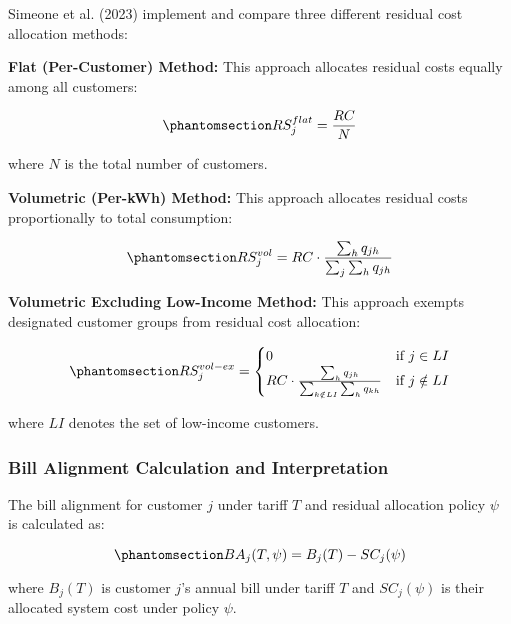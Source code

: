 \documentclass[
  11pt,
]{article}
\begin{document}
Simeone et al. (2023) implement and compare three different residual
cost allocation methods:

\textbf{Flat (Per-Customer) Method:} This approach allocates residual
costs equally among all customers:

\begin{equation}\phantomsection\label{eq-flat-residual}{RS_j^{flat} = \frac{RC}{N}}\end{equation}

where \(N\) is the total number of customers.

\textbf{Volumetric (Per-kWh) Method:} This approach allocates residual
costs proportionally to total consumption:

\begin{equation}\phantomsection\label{eq-vol-residual}{RS_j^{vol} = RC \cdot \frac{\sum_h q_{jh}}{\sum_j \sum_h q_{jh}}}\end{equation}

\textbf{Volumetric Excluding Low-Income Method:} This approach exempts
designated customer groups from residual cost allocation:

\begin{equation}\phantomsection\label{eq-vol-ex-residual}{RS_j^{vol-ex} = \begin{cases}
0 & \text{if } j \in LI \\
RC \cdot \frac{\sum_h q_{jh}}{\sum_{k \notin LI} \sum_h q_{kh}} & \text{if } j \notin LI
\end{cases}}\end{equation}

where \(LI\) denotes the set of low-income customers.

\subsubsection{Bill Alignment Calculation and
Interpretation}\label{bill-alignment-calculation-and-interpretation}

The bill alignment for customer \(j\) under tariff \(T\) and residual
allocation policy \(\psi\) is calculated as:

\begin{equation}\phantomsection\label{eq-bill-alignment}{BA_j(T,\psi) = B_j(T) - SC_j(\psi)}\end{equation}

where \(B_j(T)\) is customer \(j\)'s annual bill under tariff \(T\) and
\(SC_j(\psi)\) is their allocated system cost under policy \(\psi\).
\end{document}

